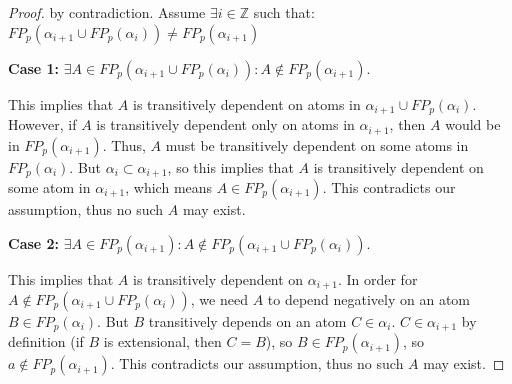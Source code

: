 \begin{proof}



by contradiction. Assume $\exists i \in \mathbb{Z}$ such that:
$FP_p(\alpha_{i+1} \cup FP_p(\alpha_i)) \neq FP_p(\alpha_{i+1})$

{\bf Case 1:} $\exists A \in FP_p(\alpha_{i+1} \cup FP_p(\alpha_i)) : A \not\in FP_p(\alpha_{i+1}).$

This implies that $A$ is transitively dependent on atoms in $\alpha_{i+1} \cup
FP_p(\alpha_i)$.  However, if $A$ is transitively dependent only on atoms in
$\alpha_{i+1}$, then $A$ would be in $FP_p(\alpha_{i+1})$.  Thus, $A$ must be
transitively dependent on some atoms in $FP_p(\alpha_{i})$.  But $\alpha_{i}
\subset \alpha_{i+1}$, so this implies that $A$ is transitively dependent on
some atom in $\alpha_{i+1}$, which means $A \in FP_p(\alpha_{i+1})$.  This
contradicts our assumption, thus no such $A$ may exist.

{\bf Case 2:} $\exists A \in FP_p(\alpha_{i+1}) : A \not\in FP_p(\alpha_{i+1} \cup FP_p(\alpha_i)).$

This implies that $A$ is transitively dependent on $\alpha_{i+1}$.  In order
for $A \not\in FP_p(\alpha_{i+1} \cup FP_p(\alpha_i))$, we need $A$ to depend
negatively on an atom $B \in FP_p(\alpha_i)$.  But $B$ transitively depends on
an atom $C \in \alpha_i$.  $C \in \alpha_{i+1}$ by definition (if $B$ is
extensional, then $C=B$), so $B \in FP_p(\alpha_{i+1})$, so $a \not\in
FP_p(\alpha_{i+1})$.  This contradicts our assumption, thus no such $A$ may
exist.
\end{proof}

